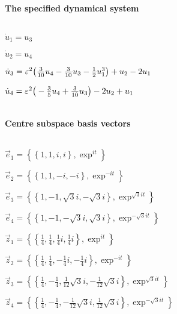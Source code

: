 
\(\)
\paragraph{The specified dynamical system}
\(
\)\par

\(\dot u_{1}=u_{3}
\)\par

\(\dot u_{2}=u_{4}
\)\par

\(\dot u_{3}=\eps^{2} \lPar \frac{3}{10} u_{4}-\frac{3}{10} u_{3}-\frac{1
}{2} u_{1}^{3}\rPar+u_{2}-2 u_{1}
\)\par

\(\dot u_{4}=\eps^{2} \lPar -\frac{3}{5} u_{4}+\frac{3}{10} u_{3}\rPar-2 u
_{2}+u_{1}
\)\par

\(\)
\paragraph{Centre
subspace basis vectors}
\(
\)\par

\(\vec e_{1}=\left\{
\left\{
1 , 1 , i , i
\right\} , \exp ^{i t}
\right\}
\)\par

\(\vec e_{2}=\left\{
\left\{
1 , 1 , -i , -i
\right\} , \exp ^{-i t}
\right\}
\)\par

\(\vec e_{3}=\left\{
\left\{
1 , -1 , \sqrt {3} i , -\sqrt {3} i
\right\} , \exp ^{\sqrt {3} i t}
\right\}
\)\par

\(\vec e_{4}=\left\{
\left\{
1 , -1 , -\sqrt {3} i , \sqrt {3} i
\right\} , \exp ^{-\sqrt {3} i t}
\right\}
\)\par

\(\vec z_{1}=\left\{
\left\{
\frac{1}{4} , \frac{1}{4} , \frac{1}{4} i , \frac{1}{4} i
\right\} , 
\exp ^{i t}
\right\}
\)\par

\(\vec z_{2}=\left\{
\left\{
\frac{1}{4} , \frac{1}{4} , -\frac{1}{4} i , -\frac{1}{4} i
\right\}
 , \exp ^{-i t}
\right\}
\)\par

\(\vec z_{3}=\left\{
\left\{
\frac{1}{4} , -\frac{1}{4} , \frac{1}{12} \sqrt {3} i , -
\frac{1}{12} \sqrt {3} i
\right\} , \exp ^{\sqrt {3} i t}
\right\}
\)\par

\(\vec z_{4}=\left\{
\left\{
\frac{1}{4} , -\frac{1}{4} , -\frac{1}{12} \sqrt {3} i , 
\frac{1}{12} \sqrt {3} i
\right\} , \exp ^{-\sqrt {3} i t}
\right\}
\)\par
